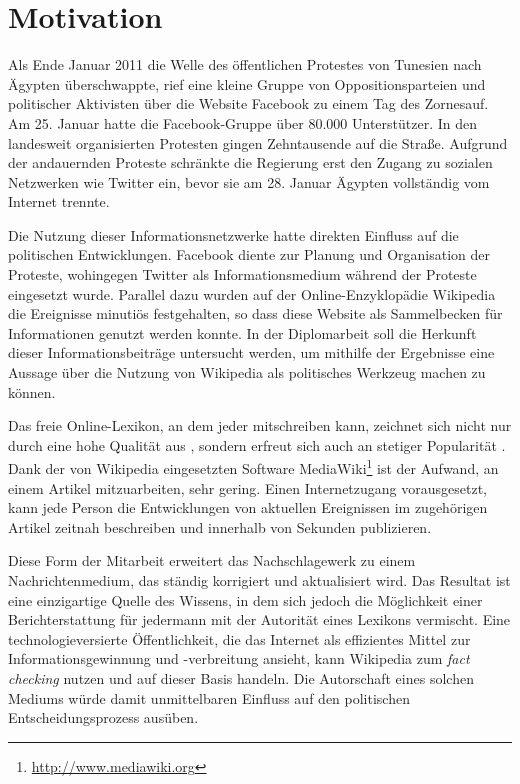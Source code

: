     
\section{Motivation}

Als Ende Januar 2011 die Welle des öffentlichen Protestes von Tunesien nach Ägypten überschwappte, rief eine kleine Gruppe von Oppositionsparteien und politischer Aktivisten über die Website Facebook zu einem \glqq Tag des Zornes\grqq auf.
Am 25. Januar hatte die Facebook-Gruppe über 80.000 Unterstützer. 
In den landesweit organisierten Protesten gingen Zehntausende auf die Straße.
Aufgrund der andauernden Proteste schränkte die Regierung erst den Zugang zu sozialen Netzwerken wie Twitter ein, bevor sie am 28. Januar Ägypten vollständig vom Internet trennte.\cite{econ18013760, szegypt}
 
Die Nutzung dieser Informationsnetzwerke hatte direkten Einfluss auf die politischen Entwicklungen. 
Facebook diente zur Planung und Organisation der Proteste, wohingegen Twitter als Informationsmedium während der Proteste eingesetzt wurde. 
Parallel dazu wurden auf der Online-Enzyklopädie Wikipedia die Ereignisse minutiös festgehalten\cite{wikiegypt}, so dass diese Website als Sammelbecken für Informationen genutzt werden konnte. 
In der Diplomarbeit soll die Herkunft dieser Informationsbeiträge untersucht werden, um mithilfe der Ergebnisse eine Aussage über die Nutzung von Wikipedia als politisches Werkzeug machen zu können. 

Das freie Online-Lexikon, an dem jeder mitschreiben kann, zeichnet sich nicht nur durch eine hohe Qualität aus \cite{giles2005internet}, sondern erfreut sich auch an stetiger Popularität \cite{wikipv}. 
Dank der von Wikipedia eingesetzten Software MediaWiki\footnote{\url{http://www.mediawiki.org}} ist der Aufwand, an einem Artikel mitzuarbeiten, sehr gering.
Einen Internetzugang vorausgesetzt, kann jede Person die Entwicklungen von aktuellen Ereignissen im zugehörigen Artikel zeitnah beschreiben und innerhalb von Sekunden publizieren.

Diese Form der Mitarbeit erweitert das Nachschlagewerk zu einem Nachrichtenmedium, das ständig korrigiert und aktualisiert wird. 
Das Resultat ist eine einzigartige Quelle des Wissens, in dem sich jedoch die Möglichkeit einer Berichterstattung für jedermann mit der Autorität eines Lexikons vermischt. 
Eine technologieversierte Öffentlichkeit, die das Internet als effizientes Mittel zur Informationsgewinnung und -verbreitung ansieht, kann Wikipedia zum \emph{fact checking} nutzen und auf dieser Basis handeln.\cite[S. 424-427]{chadwick2009routledge}
Die Autorschaft eines solchen Mediums würde damit unmittelbaren Einfluss auf den politischen Entscheidungsprozess ausüben.

